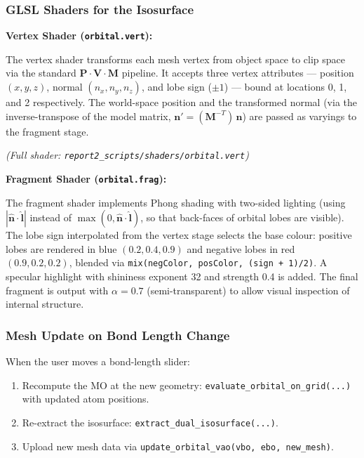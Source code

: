 \documentclass[
  11pt,
]{report}
\providecommand{\tightlist}{%
  \setlength{\itemsep}{0pt}\setlength{\parskip}{0pt}}
\begin{document}
\subsubsection{GLSL Shaders for the
Isosurface}\label{glsl-shaders-for-the-isosurface}

\textbf{Vertex Shader (\texttt{orbital.vert}):}

The vertex shader transforms each mesh vertex from object space to clip
space via the standard \(\mathbf{P} \cdot \mathbf{V} \cdot \mathbf{M}\)
pipeline. It accepts three vertex attributes --- position \((x, y, z)\),
normal \((n_x, n_y, n_z)\), and lobe sign (\(\pm 1\)) --- bound at
locations 0, 1, and 2 respectively. The world-space position and the
transformed normal (via the inverse-transpose of the model matrix,
\(\mathbf{n}' = (\mathbf{M}^{-T})\,\mathbf{n}\)) are passed as varyings
to the fragment stage.

\emph{(Full shader: \texttt{report2\_scripts/shaders/orbital.vert})}

\textbf{Fragment Shader (\texttt{orbital.frag}):}

The fragment shader implements Phong shading with two-sided lighting
(using \(|\hat{\mathbf{n}} \cdot \hat{\mathbf{l}}|\) instead of
\(\max(0, \hat{\mathbf{n}} \cdot \hat{\mathbf{l}})\), so that back-faces
of orbital lobes are visible). The lobe sign interpolated from the
vertex stage selects the base colour: positive lobes are rendered in
blue \((0.2, 0.4, 0.9)\) and negative lobes in red \((0.9, 0.2, 0.2)\),
blended via \texttt{mix(negColor,\ posColor,\ (sign\ +\ 1)/2)}. A
specular highlight with shininess exponent 32 and strength 0.4 is added.
The final fragment is output with \(\alpha = 0.7\) (semi-transparent) to
allow visual inspection of internal structure.

\subsubsection{Mesh Update on Bond Length
Change}\label{mesh-update-on-bond-length-change}

When the user moves a bond-length slider:

\begin{enumerate}
\def\labelenumi{\arabic{enumi}.}
\tightlist
\item
  Recompute the MO at the new geometry:
  \texttt{evaluate\_orbital\_on\_grid(...)} with updated atom positions.
\item
  Re-extract the isosurface: \texttt{extract\_dual\_isosurface(...)}.
\item
  Upload new mesh data via
  \texttt{update\_orbital\_vao(vbo,\ ebo,\ new\_mesh)}.
\end{enumerate}
\end{document}
